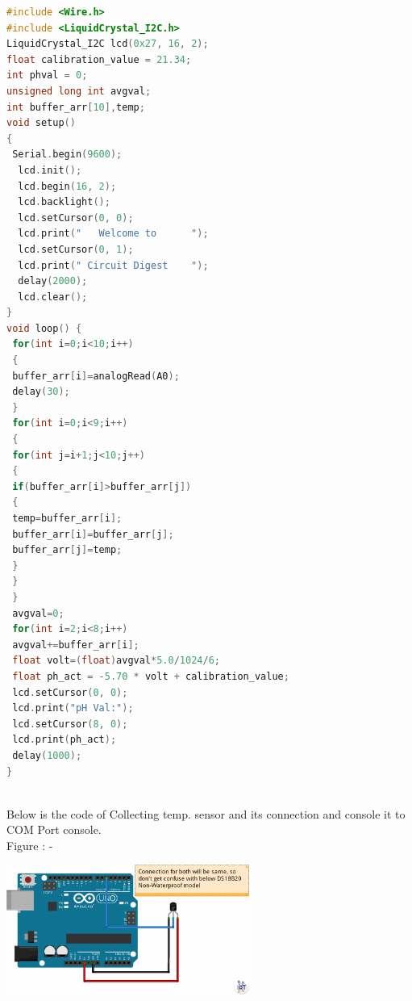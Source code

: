 \begin{lstlisting}[language=C++, caption={Arduino code for Ph sensor data}]
#include <Wire.h>
#include <LiquidCrystal_I2C.h>
LiquidCrystal_I2C lcd(0x27, 16, 2);
float calibration_value = 21.34;
int phval = 0; 
unsigned long int avgval; 
int buffer_arr[10],temp;
void setup() 
{
 Serial.begin(9600);
  lcd.init(); 
  lcd.begin(16, 2);
  lcd.backlight();
  lcd.setCursor(0, 0);
  lcd.print("   Welcome to      ");
  lcd.setCursor(0, 1);
  lcd.print(" Circuit Digest    ");
  delay(2000);
  lcd.clear();
}
void loop() {
 for(int i=0;i<10;i++) 
 { 
 buffer_arr[i]=analogRead(A0);
 delay(30);
 }
 for(int i=0;i<9;i++)
 {
 for(int j=i+1;j<10;j++)
 {
 if(buffer_arr[i]>buffer_arr[j])
 {
 temp=buffer_arr[i];
 buffer_arr[i]=buffer_arr[j];
 buffer_arr[j]=temp;
 }
 }
 }
 avgval=0;
 for(int i=2;i<8;i++)
 avgval+=buffer_arr[i];
 float volt=(float)avgval*5.0/1024/6;
 float ph_act = -5.70 * volt + calibration_value;
 lcd.setCursor(0, 0);
 lcd.print("pH Val:");
 lcd.setCursor(8, 0);
 lcd.print(ph_act);
 delay(1000);
}
\end{lstlisting}\\


Below is the code of Collecting temp. sensor and its connection and console it to COM Port console.\\

Figure : - 

\includegraphics[width=0.6\textwidth]{images/temparature_sensor-www_iotboys_com_-1024x542_LqdcDeudhb.png}\\

